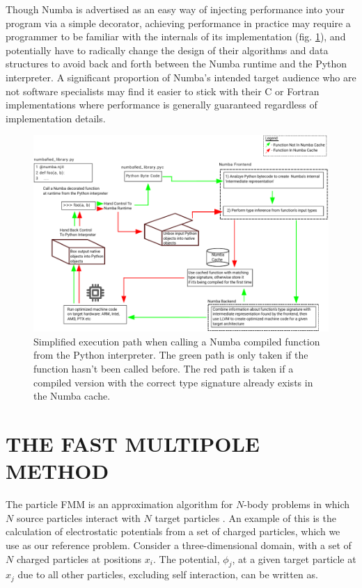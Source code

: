 \documentclass{IEEEcsmag}
\begin{document}
Though Numba is advertised as an easy way of injecting performance into your program via a simple decorator, achieving performance in practice may require a programmer to be familiar with the internals of its implementation (fig. \ref{fig:numba}), and potentially have to radically change the design of their algorithms and data structures to avoid back and forth between the Numba runtime and the Python interpreter. A significant proportion of Numba's intended target audience who are not software specialists may find it easier to stick with their C or Fortran implementations where performance is generally guaranteed regardless of implementation details.

\begin{figure}
    \centerline{\includegraphics {figures/numba.pdf}}
    \caption{Simplified execution path when calling a Numba compiled function from the Python interpreter. The green path is only taken if the function hasn't been called before. The red path is taken if a compiled version with the correct type signature already exists in the Numba cache.}
    \label{fig:numba}
\end{figure}



\section{THE FAST MULTIPOLE METHOD}

The particle FMM is an approximation algorithm for $N$-body problems in which $N$ source particles interact with $N$ target particles \cite{Greengard1987}. An example of this is the calculation of electrostatic potentials from a set of charged particles, which we use as our reference problem. Consider a three-dimensional domain, with a set of $N$ charged particles at positions $x_i$. The potential, $\phi_j$, at a given target particle at $x_j$ due to all other particles, excluding self interaction, can be written as.
\end{document}
